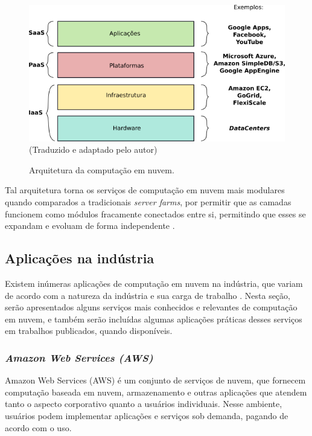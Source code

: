 \documentclass[
	12pt,				%
	a4paper,			%
	english,			%
	french,				%
	spanish,			%
	brazil				%
	]{abntex2}
\begin{document}
\begin{figure}[h]
	\caption{Arquitetura da computação em nuvem.}
	\includegraphics{images/arqcompnuvem.png}
	\centering
	\label{fig:arqcompnuvem}
	\textual (Traduzido e adaptado pelo autor)
\end{figure}

Tal arquitetura torna os serviços de computação em nuvem mais modulares quando comparados a tradicionais \emph{server farms}, por permitir que as camadas funcionem como módulos fracamente conectados entre si, permitindo que esses se expandam e evoluam de forma independente \cite[p. 9]{zhang2010cloud}.

\subsection{Aplicações na indústria}

Existem inúmeras aplicações de computação em nuvem na indústria, que variam de acordo com a natureza da indústria e sua carga de trabalho \cite[p. 10]{khan2018cloud}. Nesta seção, serão apresentados alguns serviços mais conhecidos e relevantes de computação em nuvem, e também serão incluídas algumas aplicações práticas desses serviços em trabalhos publicados, quando disponíveis.

\subsubsection{\emph{Amazon Web Services (AWS)}}

Amazon Web Services (AWS) \cite{aws} é um conjunto de serviços de nuvem, que fornecem computação baseada em nuvem, armazenamento e outras aplicações que atendem tanto o aspecto corporativo quanto a usuários individuais. Nesse ambiente, usuários podem implementar aplicações e serviços sob demanda, pagando de acordo com o uso. \cite[p. 13]{zhang2010cloud}
\end{document}

